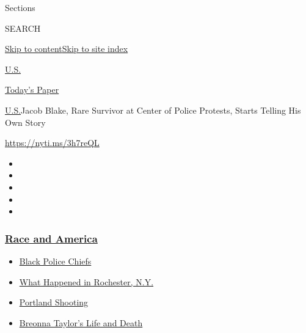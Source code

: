 Sections

SEARCH

\protect\hyperlink{site-content}{Skip to
content}\protect\hyperlink{site-index}{Skip to site index}

\href{https://www.nytimes3xbfgragh.onion/section/us}{U.S.}

\href{https://myaccount.nytimes3xbfgragh.onion/auth/login?response_type=cookie\&client_id=vi}{}

\href{https://www.nytimes3xbfgragh.onion/section/todayspaper}{Today's
Paper}

\href{/section/us}{U.S.}\textbar{}Jacob Blake, Rare Survivor at Center
of Police Protests, Starts Telling His Own Story

\url{https://nyti.ms/3h7reQL}

\begin{itemize}
\item
\item
\item
\item
\item
\end{itemize}

\hypertarget{race-and-america}{%
\subsubsection{\texorpdfstring{\href{https://www.nytimes3xbfgragh.onion/news-event/george-floyd-protests-minneapolis-new-york-los-angeles?name=styln-george-floyd\&region=TOP_BANNER\&block=storyline_menu_recirc\&action=click\&pgtype=Article\&impression_id=cbd261b0-f52c-11ea-a089-112dddf69edf\&variant=undefined}{Race
and America}}{Race and America}}\label{race-and-america}}

\begin{itemize}
\tightlist
\item
  \href{https://www.nytimes3xbfgragh.onion/2020/09/11/us/black-police-chiefs-reform.html?name=styln-george-floyd\&region=TOP_BANNER\&block=storyline_menu_recirc\&action=click\&pgtype=Article\&impression_id=cbd288c0-f52c-11ea-a089-112dddf69edf\&variant=undefined}{Black
  Police Chiefs}
\item
  \href{https://www.nytimes3xbfgragh.onion/2020/09/04/nyregion/rochester-police-daniel-prude.html?name=styln-george-floyd\&region=TOP_BANNER\&block=storyline_menu_recirc\&action=click\&pgtype=Article\&impression_id=cbd2afd0-f52c-11ea-a089-112dddf69edf\&variant=undefined}{What
  Happened in Rochester, N.Y.}
\item
  \href{https://www.nytimes3xbfgragh.onion/2020/08/30/us/portland-shooting-explained.html?name=styln-george-floyd\&region=TOP_BANNER\&block=storyline_menu_recirc\&action=click\&pgtype=Article\&impression_id=cbd2d6e0-f52c-11ea-a089-112dddf69edf\&variant=undefined}{Portland
  Shooting}
\item
  \href{https://www.nytimes3xbfgragh.onion/2020/08/30/us/breonna-taylor-police-killing.html?name=styln-george-floyd\&region=TOP_BANNER\&block=storyline_menu_recirc\&action=click\&pgtype=Article\&impression_id=cbd2d6e1-f52c-11ea-a089-112dddf69edf\&variant=undefined}{Breonna
  Taylor's Life and Death}
\end{itemize}

